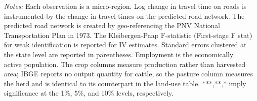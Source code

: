 \begin{table}[p]
{{\begin{tabular}{l*{10}{c}}
\hline\hline
\end{tabular}}
}
\usebox{\tabbox}
\begin{minipage}{\wd\tabbox}
    \vspace{0.1cm}
    {\footnotesize \sloppy \textit{Notes: } Each observation is a micro-region. Log change in travel time on roads is instrumented by the change in travel times on the predicted road network. The predicted road network is created by geo-referencing the PNV National Transportation Plan in 1973. The Kleibergen-Paap F-statistic (First-stage F stat) for weak identification is reported for IV estimates. Standard errors clustered at the state level are reported in parentheses. Employment is the economically active population. The crop columns measure production rather than harvested area; IBGE reports no output quantity for cattle, so the pasture column measures the herd and is identical to its counterpart in the land-use table. ***,**,* imply significance at the 1\%, 5\%, and 10\% levels, respectively.}
\end{minipage}
\endgroup
\end{table}
